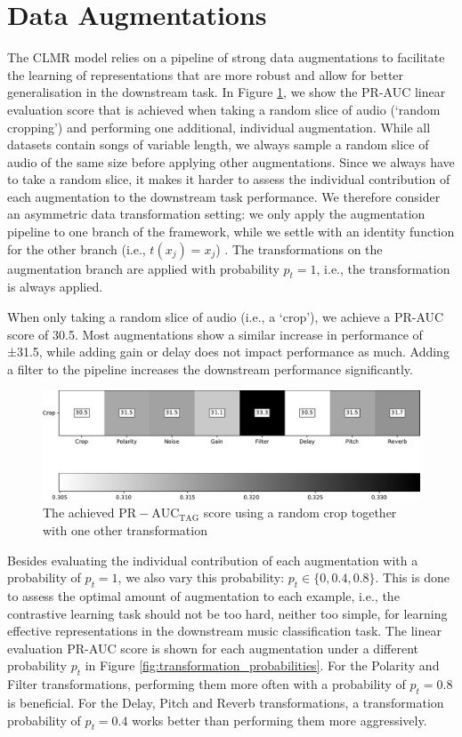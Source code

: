 \section{Data Augmentations}\label{sec:data_augmentations}
The CLMR model relies on a pipeline of strong data augmentations to facilitate the learning of representations that are more robust and allow for better generalisation in the downstream task.
In Figure \ref{fig:transformation_study}, we show the PR-AUC linear evaluation score that is achieved when taking a random slice of audio (`random cropping') and performing one additional, individual augmentation.
While all datasets contain songs of variable length, we always sample a random slice of audio of the same size before applying other augmentations.
Since we always have to take a random slice, it makes it harder to assess the individual contribution of each augmentation to the downstream task performance.
We therefore consider an asymmetric data transformation setting: we only apply the augmentation pipeline to one branch of the framework, while we settle with an identity function for the other branch (i.e., $t(x_j) = x_j$) \cite{chen_simple_2020}. The transformations on the augmentation branch are applied with probability $p_t=1$, i.e., the transformation is always applied.

When only taking a random slice of audio (i.e., a `crop'), we achieve a PR-AUC score of 30.5.
Most augmentations show a similar increase in performance of ±31.5, while adding gain or delay does not impact performance as much.
Adding a filter to the pipeline increases the downstream performance significantly.

\begin{figure}[h]
    \centering
    \includegraphics[width=\columnwidth]{figs/transformation_study.pdf}
    \caption{The achieved $\mathrm{PR-AUC}_{\mathrm{TAG}}$ score using a random crop together with one other transformation}
    \label{fig:transformation_study}
\end{figure}

Besides evaluating the individual contribution of each augmentation with a probability of $p_t = 1$, we also vary this probability: $p_t \in \{ 0, 0.4, 0.8 \}$.
This is done to assess the optimal amount of augmentation to each example, i.e., the contrastive learning task should not be too hard, neither too simple, for learning effective representations in the downstream music classification task.
The linear evaluation PR-AUC score is shown for each augmentation under a different probability $p_t$ in Figure \ref{fig:transformation_probabilities}. For the Polarity and Filter transformations, performing them more often with a probability of $p_t = 0.8$ is beneficial. For the Delay, Pitch and Reverb transformations, a transformation probability of $p_t = 0.4$ works better than performing them more aggressively.

